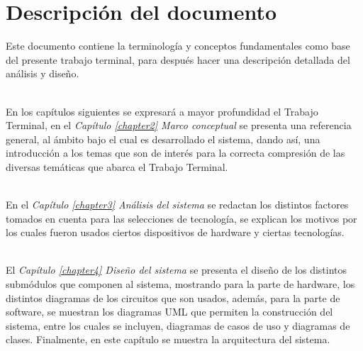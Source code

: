 \section{Descripción del documento}
Este documento contiene la terminología y conceptos fundamentales como base del presente trabajo terminal, para después hacer una descripción detallada del análisis y diseño. 

\\
En los capítulos siguientes se expresará a mayor profundidad el Trabajo Terminal, en el \textit{Capítulo \ref{chapter2} Marco conceptual} se presenta una referencia general, al ámbito bajo el cual es desarrollado el sistema, dando así, una introducción a los temas que son de interés para la correcta compresión de las diversas temáticas que abarca el Trabajo Terminal.

\\
En el \textit{Capítulo \ref{chapter3} Análisis del sistema} se redactan los distintos factores tomados en cuenta para las selecciones de tecnología, se explican los motivos por los cuales fueron usados ciertos dispositivos de hardware y ciertas tecnologías.

\\
El \textit{Capítulo \ref{chapter4} Diseño del sistema} se presenta el diseño de los distintos submódulos que componen al sistema, mostrando para la parte de hardware, los distintos diagramas de los circuitos que son usados, además, para la parte de software, se muestran los diagramas UML que permiten la construcción del sistema, entre los cuales se incluyen, diagramas de casos de uso y diagramas de clases. Finalmente, en este capítulo se muestra la arquitectura del sistema. %
\\

